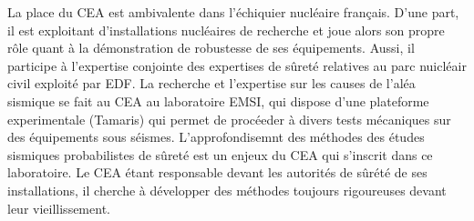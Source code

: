 













La place du CEA est ambivalente dans l'échiquier nucléaire français.
D'une part, il est exploitant d'installations nucléaires de recherche 
et joue alors son propre rôle quant à la démonstration de robustesse de ses équipements.
Aussi,
il participe à l'expertise conjointe des expertises de sûreté relatives au parc nuicléair civil exploité par EDF. 
La recherche et l'expertise sur les causes de l'aléa sismique %
se fait au CEA au laboratoire EMSI, qui dispose d'une plateforme experimentale (Tamaris) qui permet de procéeder à divers tests mécaniques sur des équipements sous séismes. 
L'approfondisemnt des méthodes des études sismiques probabilistes de sûreté est un enjeux du CEA qui s'inscrit dans ce laboratoire. Le CEA étant responsable devant les autorités de sûrété de ses installations, il cherche %
à développer des méthodes toujours rigoureuses devant leur vieillissement. %



